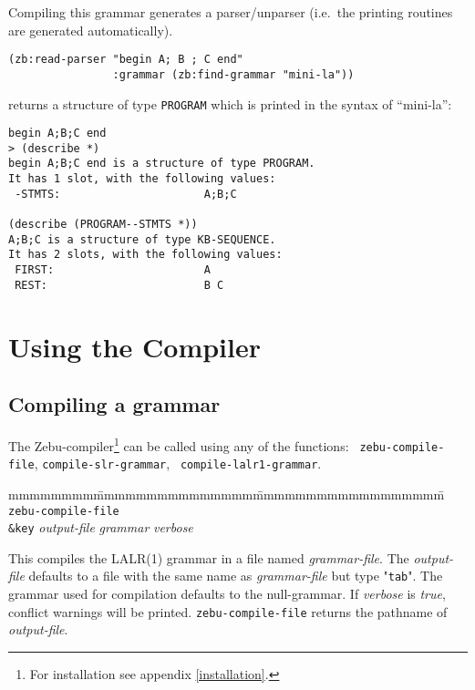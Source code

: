 Compiling this grammar generates a parser/unparser (i.e.\ the printing
routines are generated automatically).

{\tt \begin{verbatim}
(zb:read-parser "begin A; B ; C end"
                :grammar (zb:find-grammar "mini-la"))
     \end{verbatim}
}

returns a structure of type {\tt PROGRAM} which is printed in the
syntax of ``mini-la'':

{\tt \begin{verbatim}
begin A;B;C end
> (describe *)
begin A;B;C end is a structure of type PROGRAM.
It has 1 slot, with the following values:
 -STMTS:                      A;B;C

(describe (PROGRAM--STMTS *))
A;B;C is a structure of type KB-SEQUENCE.
It has 2 slots, with the following values:
 FIRST:                       A
 REST:                        B C
     \end{verbatim}
}

\section{Using the Compiler} \label{Compiler}

\subsection{Compiling a grammar}

The {\sf Zebu}-compiler\footnote{For installation see appendix
\ref{installation}.} can be called using any of the functions: {\tt
zebu-compile-file}, {\tt compile-slr-grammar}, {\tt
compile-lalr1-grammar}.  

 

\begin{tabbing}
mmmmmmmm\=mmmmmmmmmmmmmmm\=mmmmmmmmmmmmmmmmmm\=\kill
{\tt zebu-compile-file}                        \>\> \\
     {\tt \&key} {\em output-file} {\em grammar} {\em verbose}
\end{tabbing}

This compiles the LALR(1) grammar in a file named {\em grammar-file}.
The {\em output-file} defaults to a file with the same name as {\em
grammar-file} but type "{\tt tab}".  The grammar used for compilation
defaults to the null-grammar. If {\em verbose} is {\em true}, conflict
warnings will be printed.  {\tt zebu-compile-file} returns the
pathname of {\em output-file}.

